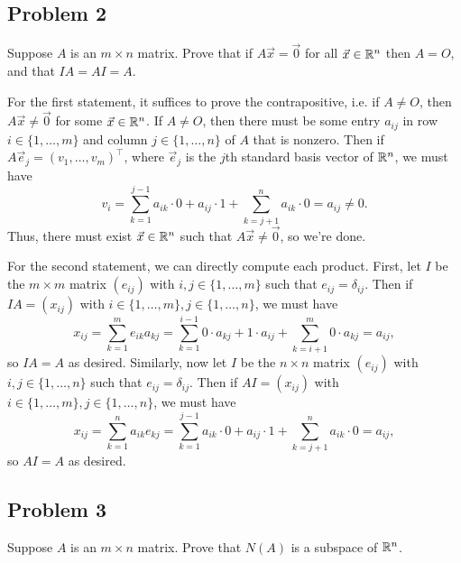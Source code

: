 \documentclass[main.tex]{subfiles}
\begin{document}
\subsection{Problem 2}
\begin{claim}
    Suppose $A$ is an $m \times n$ matrix. Prove that if $A\vec{x} = \vec{0}$ for all $\vec{x} \in \mathbb R^n$ then $A = O$, and that $IA = AI = A$.
\end{claim}

\begin{soln}
    For the first statement, it suffices to prove the contrapositive, i.e. if $A\neq O$, then $A\vec{x} \neq \vec{0}$ for some $\vec{x}\in \mathbb R^n$. If $A\neq O$, then there must be some entry $a_{ij}$ in row $i\in \{1, \ldots , m\}$ and column $j\in \{1, \ldots , n\}$ of $A$ that is nonzero. Then if $A\vec{e}_j = (v_1, \ldots , v_m)^\top$, where $\vec{e}_j$ is the $j$th standard basis vector of $\mathbb R^n$, we must have
    \[v_i = \sum_{k = 1}^{j - 1}a_{ik}\cdot 0 + a_{ij} \cdot 1 + \sum_{k = j + 1}^n a_{ik}\cdot 0 = a_{ij}\neq 0.\]
    Thus, there must exist $\vec{x}\in \mathbb R^n$ such that $A\vec{x}\neq \vec{0}$, so we're done.

    For the second statement, we can directly compute each product. First, let $I$ be the $m\times m$ matrix $(e_{ij})$ with $i, j\in \{1, \ldots , m\}$ such that $e_{ij} = \delta_{ij}$. Then if $IA = (x_{ij})$ with $i\in \{1, \ldots , m\}, j\in \{1, \ldots , n\}$, we must have
    \[x_{ij} = \sum_{k = 1}^m e_{ik}a_{kj} = \sum_{k = 1}^{i - 1} 0\cdot a_{kj} + 1 \cdot a_{ij} + \sum_{k = i + 1}^m 0\cdot a_{kj} = a_{ij},\]
    so $IA = A$ as desired. Similarly, now let $I$ be the $n\times n$ matrix $(e_{ij})$ with $i, j\in \{1, \ldots , n\}$ such that $e_{ij} = \delta_{ij}$. Then if $AI = (x_{ij})$ with $i\in \{1, \ldots , m\}, j\in \{1, \ldots , n\}$, we must have
    \[x_{ij} = \sum_{k = 1}^n a_{ik}e_{kj} = \sum_{k = 1}^{j - 1} a_{ik}\cdot 0 + a_{ij}\cdot 1 + \sum_{k = j + 1}^n a_{ik}\cdot 0 = a_{ij},\]
    so $AI = A$ as desired.
\end{soln}
\eject

\subsection{Problem 3}
\begin{claim}
    Suppose $A$ is an $m \times n$ matrix. Prove that $N(A)$ is a subspace of $\mathbb R^n$.
\end{claim}
\end{document}
